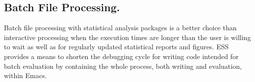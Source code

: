 \documentclass{article}
\newcommand*{\SAS}{\textsc{SAS}}
\newcommand{\stexttt}[1]{{\small\texttt{#1}}}
\begin{document}

\subsection{Batch File Processing.}
\label{sec:batch-file}

Batch file processing with statistical analysis packages is a better
choice than interactive processing when the execution times are longer
than the user is willing to wait as well as for regularly updated
statistical reports and figures.  ESS provides a means to shorten the
debugging cycle for writing code intended for batch evaluation by
containing the whole process, both writing and evaluation, within
Emacs.
\end{document}
